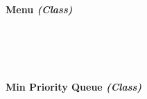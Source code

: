 \begin{FlushLeft}
\begin{enumerate}
    \bk

    \paragraph{Menu \textit{(Class)}} \mbox{} \\

    \begin{figure}[H]
        \centering
    \end{figure}\\

    \bk
    
    \paragraph{Min Priority Queue \textit{(Class)}} \mbox{} \\


\end{enumerate}
\end{FlushLeft}

